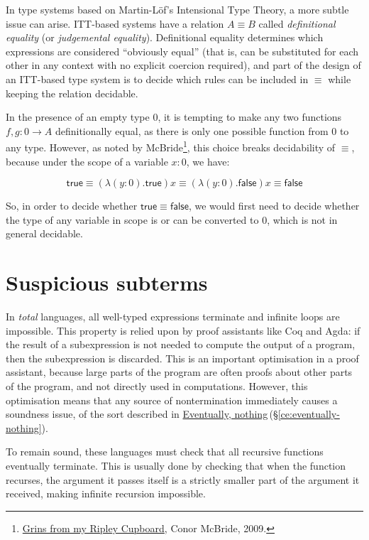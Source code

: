 \documentclass[11pt,oneside]{article}
\makeatletter
\newcommand{\entryref}[2]{\hyperref[#1]{#2}\,\textcolor{stone}{(\S\ref*{#1})}}
\newcommand{\tags}[1]{%
  \par\vspace{-0.55\baselineskip}%
  \noindent{\footnotesize\sffamily\color{lichen}#1}%
  \par\vspace{0.75\baselineskip}%
  \@afterindentfalse\@afterheading}
\makeatother
\begin{document}
In type systems based on Martin-Löf's Intensional Type Theory, a more subtle issue can arise. ITT-based systems have a relation \(A ≡ B\) called \emph{definitional equality} (or \emph{judgemental equality}). Definitional equality determines which expressions are considered ``obviously equal'' (that is, can be substituted for each other in any context with no explicit coercion required), and part of the design of an ITT-based type system is to decide which rules can be included in \(≡\) while keeping the relation decidable.

In the presence of an empty type \(0\), it is tempting to make any two functions \(f, g : 0 → A\) definitionally equal, as there is only one possible function from \(0\) to any type. However, as noted by McBride\footnote{\href{http://strictlypositive.org/Ripley.pdf}{Grins from my Ripley Cupboard}, Conor McBride, 2009.}, this choice breaks decidability of \(≡\), because under the scope of a variable \(x : 0\), we have:

\[
  \mathsf{true} ≡ (λ (y : 0). \mathsf{true}) x ≡ (λ (y : 0). \mathsf{false}) x ≡ \mathsf{false}
\]

So, in order to decide whether \(\mathsf{true} ≡ \mathsf{false}\), we would first need to decide whether the type of any variable in scope is or can be converted to \(0\), which is not in general decidable.

\clearpage
\section{Suspicious subterms}\label{ce:suspicious-subterms}
\tags{\hyperref[gloss:totality]{Totality}}
In \emph{total} languages, all well-typed expressions terminate and infinite loops are impossible. This property is relied upon by proof assistants like Coq and Agda: if the result of a subexpression is not needed to compute the output of a program, then the subexpression is discarded. This is an important optimisation in a proof assistant, because large parts of the program are often proofs about other parts of the program, and not directly used in computations. However, this optimisation means that any source of nontermination immediately causes a soundness issue, of the sort described in \entryref{ce:eventually-nothing}{Eventually, nothing}.

To remain sound, these languages must check that all recursive functions eventually terminate. This is usually done by checking that when the function recurses, the argument it passes itself is a strictly smaller part of the argument it received, making infinite recursion impossible.
\end{document}
